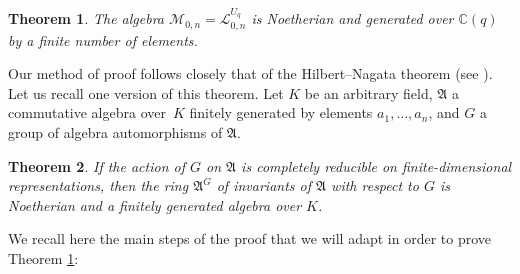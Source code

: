 \documentclass[10pt,a4paper]{amsart}
\numberwithin{equation}{section}
\newtheorem{teo}{Theorem}[section]
\theoremstyle{definition}
\newcommand{\Mm}{{\mathcal M}}
\begin{document}
\begin{teo}\label{MonNoeth} The algebra $\Mm_{0,n} = {\mathcal L}_{0,n}^{U_q}$ is Noetherian and generated over ${\mathbb C}(q)$ by a finite number of elements.
\end{teo}
Our method of proof follows closely that of the Hilbert--Nagata theorem (see \cite{DC}). Let us recall one version of this theorem. Let $K$ be an arbitrary field, $\mathfrak{A}$ a commutative algebra over~$K$ finitely generated by elements $a_1,\dots,a_n$, and $G$ a group of algebra automorphisms of $\mathfrak{A}$.
\begin{teo} If the action of $G$ on $\mathfrak{A}$ is completely reducible on finite-dimensional representations, then the ring $\mathfrak{A}^G$ of invariants of $\mathfrak{A}$ with respect to $G$ is Noetherian and a finitely generated algebra over $K$.
\end{teo}
We recall here the main steps of the proof that we will adapt in order to prove Theorem \ref{MonNoeth}:
\end{document}
